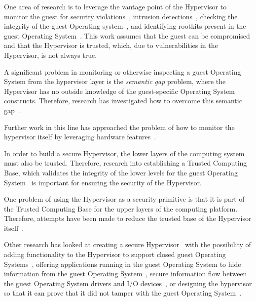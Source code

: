 \documentclass[11pt,letterpaper]{article}
\begin{document}
One area of research is to leverage the vantage point of the
Hypervisor to monitor the guest for security
violations~\cite{karger1991, barham2003}, intrusion
detections~\cite{dunlap2002, garfinkel2003a, kourai2005, chen2008,
  garfinkel2003b}, checking the integrity of the guest Operating
system~\cite{seshadri2006, mccune2010}, and identifying rootkits present
in the guest Operating System~\cite{jones2008, grace2010}. This work
assumes that the guest can be compromised and that the Hypervisor is
trusted, which, due to vulnerabilities in the Hypervisor, is not
always true.

A significant problem in monitoring or otherwise inspecting a guest
Operating System from the hypervisor layer is the \emph{semantic gap}
problem, where the Hypervisor has no outside knowledge of the
guest-specific Operating System constructs. Therefore, research has
investigated how to overcome this semantic gap~\cite{jones2006,
  christodorescu2009, srinivasan2011}.

Further work in this line has approached the problem of how to monitor
the hypervisor itself by leveraging hardware features~\cite{azab2010}.

In order to build a secure Hypervisor, the lower layers of the
computing system must also be trusted. Therefore, research into
establishing a Trusted Computing Base, which validates the integrity
of the lower levels for the guest Operating System~\cite{arbaugh1997,
  sailer2004, singaravelu2006} is important for ensuring the security
of the Hypervisor.

One problem of using the Hypervisor as a security primitive is that it
is part of the Trusted Computing Base for the upper layers of the
computing platform. Therefore, attempts have been made to reduce the
trusted base of the Hypervisor itself~\cite{murray2008, shinagawa2009,
  colp2011, wang2012}.

Other research has looked at creating a secure
Hypervisor~\cite{robin2000, belay2012, szefer2011, vasudevan2013} with
the possibility of adding functionality to the Hypervisor to support
closed guest Operating Systems~\cite{garfinkel2003}, offering
applications running in the guest Operating System to hide information
from the guest Operating System~\cite{chen2008, yang2008, jin2011,
  szefer2012, azab2011, zhang2011, jin2011a, szefer2011a}, secure
information flow between the guest Operating System drivers and I/O
devices~\cite{cheng2013}, or designing the hypervisor so that it can
prove that it did not tamper with the guest Operating
System~\cite{gu2011}.
\end{document}

